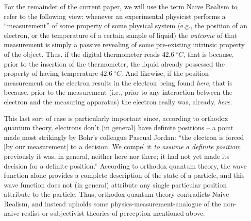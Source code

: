 \documentclass[12pt]{article}
\begin{document}
For the remainder of the current paper, we will use the term Naive
Realism to refer to the following view:  whenever an experimental
physicist performs a ``measurement'' of some property of some
physical system (e.g., the position of an electron, or the 
temperature of a certain sample of liquid) the \emph{outcome} of that
measurement is simply a passive revealing of some pre-existing
intrinsic property of the object.  Thus, if the digital thermometer
reads $42.6 \; ^\circ C$, that is because, prior to the insertion of
the thermometer, the liquid already possessed the property of having
temperature $42.6 \;
^\circ C$.  And likewise, if the position measurement on the 
electron results in the electron being found \emph{here}, that is
because, prior to the measurement (i.e., prior to any interaction
between the electron and the measuring apparatus) the electron really
was, already, \emph{here}.

This last sort of case is particularly important since, according to
orthodox quantum theory, electrons don't (in general) have definite
positions -- a point made most strikingly by Bohr's colleague 
Pascual Jordan:  ``the electron is forced [by our measurement] to a
decision.  We compel it \emph{to assume a definite position};
previously it was, in general, neither here nor there; it had not yet
made its decision for a definite position.'' \cite[page 142]{bell}
According to orthodox quantum theory, the wave function alone
provides a complete description of the state of a particle, and this
wave function does not (in general) attribute any single particular
position attribute to the particle.  Thus, orthodox quantum theory
contradicts Naive Realism, and instead upholds some
physics-measurement-analogue of the non-naive realist or subjectivist 
theories of perception mentioned above.
\end{document}
